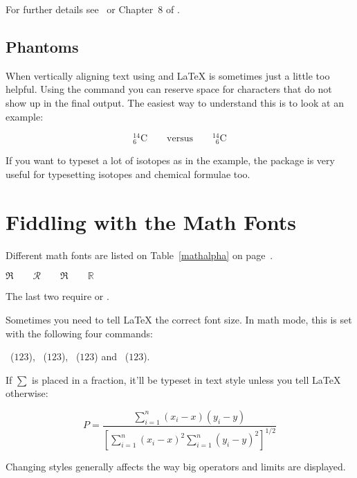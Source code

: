 For further details see~\cite{amstestmath} or Chapter~8 of \companion{}.

\subsection{Phantoms}

When vertically aligning text using \ai{\^} and \ai{\_} \LaTeX{} is sometimes
just a little too helpful. Using the  command you can
reserve space for characters that do not show up in the final output.
The easiest way to understand this is to look at an example:
\begin{example}
\begin{equation*}
{}^{14}_{6}\text{C}
\qquad \text{versus} \qquad
{}^{14}_{\phantom{1}6}\text{C}
\end{equation*}
\end{example}
If you want to typeset a lot of isotopes as in the example, the 
package is very useful for typesetting isotopes and chemical formulae too.


\section{Fiddling with the Math Fonts}\label{sec:fontsz}
Different math fonts are listed on Table~\ref{mathalpha} on page~\pageref{mathalpha}.
\begin{example}
 $\Re \qquad
  \mathcal{R} \qquad
  \mathfrak{R} \qquad
  \mathbb{R} \qquad $  
\end{example}
The last two require  or .

Sometimes you need to tell \LaTeX{} the correct font
size. In math mode, this is set with the following four commands:
\begin{flushleft}
  ~($\displaystyle 123$),
  ~($\textstyle 123$),
  ~($\scriptstyle 123$) and
  ~($\scriptscriptstyle 123$).
\end{flushleft}

If $\sum$ is placed in a fraction, it'll be typeset in text style unless you tell
\LaTeX{} otherwise:
\begin{example}
\begin{equation*}
 P = \frac{\displaystyle{ 
   \sum_{i=1}^n (x_i- x)
   (y_i- y)}} 
   {\displaystyle{\left[
   \sum_{i=1}^n(x_i-x)^2
   \sum_{i=1}^n(y_i- y)^2
   \right]^{1/2}}}
\end{equation*}    
\end{example}
Changing styles generally affects the way big operators and limits are displayed.

